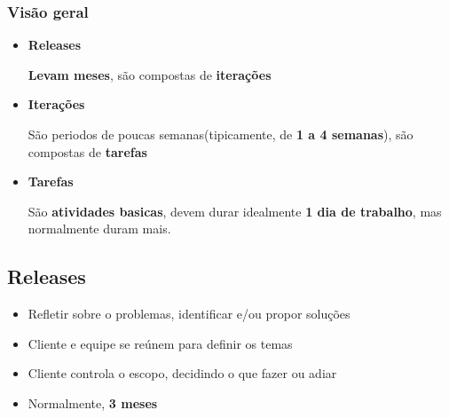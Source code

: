 \documentclass[10pt]{beamer}
\begin{document}
\begin{frame}
  \frametitle{Visão geral}
  \begin{itemize}%
  \item \textbf{Releases}
    \begin{block}{}
      \textbf{Levam meses}, são compostas de \textbf{iterações}
    \end{block}
  \item \textbf{Iterações}
    \begin{block}{}
      São periodos de poucas semanas(tipicamente, de \textbf{1 a 4 semanas}), são compostas de \textbf{tarefas}
    \end{block}
  \item \textbf{Tarefas}
    \begin{block}{}
      São \textbf{atividades basicas}, devem durar idealmente \textbf{1 dia de trabalho}, mas normalmente duram mais.
    \end{block}
  \end{itemize}
\end{frame}


\subsection{Releases}

\begin{frame}
  \begin{figure}
    \centering
  \end{figure}
  \begin{itemize}%
    \item Refletir sobre o problemas, identificar e/ou propor soluções
    \item Cliente e equipe se reúnem para definir os temas
    \item Cliente controla o escopo, decidindo o que fazer ou adiar
    \item Normalmente, \textbf{3 meses}
  \end{itemize}
\end{frame}
\end{document}
